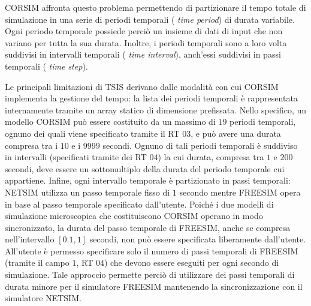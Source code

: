 \acs{CORSIM} affronta questo problema permettendo di partizionare il tempo totale di simulazione in una serie di periodi temporali (\ie{} \emph{time period}) di durata variabile. Ogni periodo temporale possiede perciò un insieme di dati di input che non variano per tutta la sua durata. Inoltre, i periodi temporali sono a loro volta suddivisi in intervalli temporali (\ie{} \emph{time interval}), anch'essi suddivisi in passi temporali (\ie{} \emph{time step}).

Le principali limitazioni di \acs{TSIS} derivano dalle modalità con cui \acs{CORSIM} implementa la gestione del tempo: la lista dei periodi temporali è rappresentata internamente tramite un array statico di dimensione prefissata. Nello specifico, un modello \acs{CORSIM} può essere costituito da un massimo di $19$ periodi temporali, ognuno dei quali viene specificato tramite il \acs{RT} $03$, e può avere una durata compresa tra i $10$ e i $9999$ secondi. Ognuno di tali periodi temporali è suddiviso in intervalli (specificati tramite dei \acs{RT} $04$) la cui durata, compresa tra $1$ e $200$ secondi, deve essere un sottomultiplo della durata del periodo temporale cui appartiene. Infine, ogni intervallo temporale è partizionato in passi temporali: \acs{NETSIM} utilizza un passo temporale fisso di $1$ secondo mentre \acs{FREESIM} opera in base al passo temporale specificato dall'utente. Poiché i due modelli di simulazione microscopica che costituiscono \acs{CORSIM} operano in modo sincronizzato, la durata del passo temporale di \acs{FREESIM}, anche se compresa nell'intervallo $[0.1,1]$ secondi, non può essere specificata liberamente dall'utente. All'utente è permesso specificare solo il numero di passi temporali di \acs{FREESIM} (tramite il campo $1$, \acs{RT} $04$) che devono essere eseguiti per ogni secondo di simulazione. Tale approccio permette perciò di utilizzare dei passi temporali di durata minore per il simulatore \acs{FREESIM} mantenendo la sincronizzazione con il simulatore \acs{NETSIM}.

